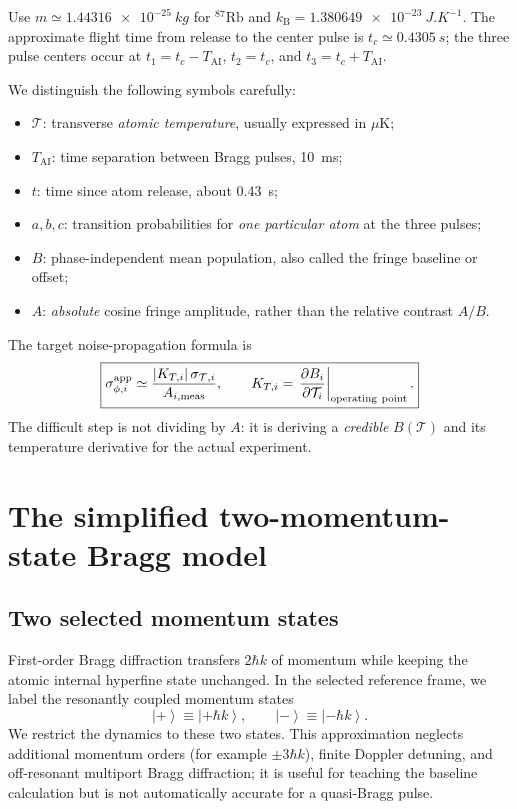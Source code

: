 \documentclass[11pt,a4paper]{article}
\numberwithin{equation}{section}
\newcommand{\Tat}{\mathcal{T}}
\newcommand{\Tai}{T_{\mathrm{AI}}}
\newcommand{\kb}{k_{\mathrm B}}
\newcommand{\ket}[1]{\left|#1\right\rangle}
\newcommand{\Rb}{^{87}\mathrm{Rb}}
\begin{document}
Use $m\simeq\SI{1.44316e-25}{kg}$ for $\Rb$ and
$\kb=\SI{1.380649e-23}{J.K^{-1}}$. The approximate flight time from release
to the center pulse is $t_c\simeq\SI{0.4305}{s}$; the three pulse centers
occur at $t_1=t_c-\Tai$, $t_2=t_c$, and $t_3=t_c+\Tai$.

We distinguish the following symbols carefully:
\begin{itemize}
\item $\Tat$: transverse \emph{atomic temperature}, usually expressed in $\mu$K;
\item $\Tai$: time separation between Bragg pulses, \SI{10}{ms};
\item $t$: time since atom release, about \SI{0.43}{s};
\item $a,b,c$: transition probabilities for \emph{one particular atom} at the three pulses;
\item $B$: phase-independent mean population, also called the fringe baseline or offset;
\item $A$: \emph{absolute} cosine fringe amplitude, rather than the relative contrast $A/B$.
\end{itemize}

\begin{keybox}
The target noise-propagation formula is
\begin{equation}\label{eq:goal}
\boxed{\sigma_{\phi,i}^{\rm app}\simeq
 \frac{|K_{T,i}|\,\sigma_{\Tat,i}}{A_{i,\rm meas}},\qquad
 K_{T,i}=\left.\frac{\partial B_i}{\partial\Tat_i}\right|_{\rm operating\ point}.}
\end{equation}
The difficult step is not dividing by $A$: it is deriving a \emph{credible}
$B(\Tat)$ and its temperature derivative for the actual experiment.
\end{keybox}

\section{The simplified two-momentum-state Bragg model}

\subsection{Two selected momentum states}

First-order Bragg diffraction transfers $2\hbar k$ of momentum while keeping
the atomic internal hyperfine state unchanged. In the selected reference frame,
we label the resonantly coupled momentum states
\begin{equation}
 \ket{+}\equiv\ket{+\hbar k},\qquad
 \ket{-}\equiv\ket{-\hbar k}.
\end{equation}
We restrict the dynamics to these two states. This approximation neglects
additional momentum orders (for example $\pm3\hbar k$), finite Doppler
detuning, and off-resonant multiport Bragg diffraction; it is useful for
teaching the baseline calculation but is not automatically accurate for a
quasi-Bragg pulse.
\end{document}
